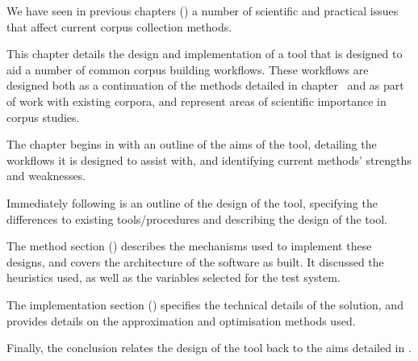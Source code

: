 

We have seen in previous chapters () a number of scientific and practical issues that affect current corpus collection methods.

This chapter details the design and implementation of a tool that is designed to aid a number of common corpus building workflows.  These workflows are designed both as a continuation of the methods detailed in chapter~ and as part of work with existing corpora, and represent areas of scientific importance in corpus studies.

The chapter begins in  with an outline of the aims of the tool, detailing the workflows it is designed to assist with, and identifying current methods' strengths and weaknesses.

Immediately following is an outline of the design of the tool, specifying the differences to existing tools/procedures and describing the design of the tool.

The method section () describes the mechanisms used to implement these designs, and covers the architecture of the software as built.  It discussed the heuristics used, as well as the variables selected for the test system.

The implementation section () specifies the technical details of the solution, and provides details on the approximation and optimisation methods used.  


Finally, the conclusion relates the design of the tool back to the aims detailed in .
